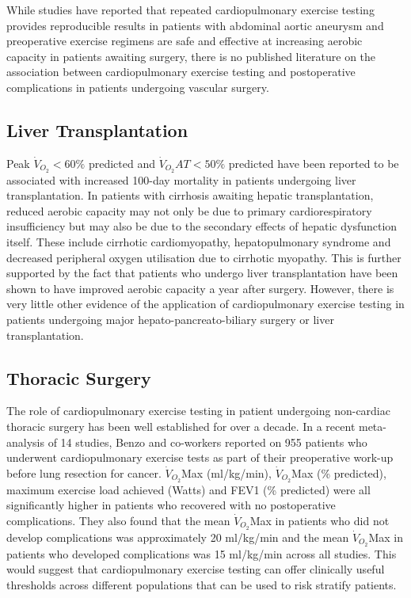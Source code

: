 While studies have reported that repeated cardiopulmonary exercise testing provides reproducible results in patients with abdominal aortic aneurysm and preoperative exercise regimens are safe and effective at increasing aerobic capacity in patients awaiting surgery, there is no published literature on the association between cardiopulmonary exercise testing and postoperative complications in patients undergoing vascular surgery. %

\subsection{Liver Transplantation}
Peak $\dot{V}_{O_2}<60\%$ predicted and $\dot{V}_{O_2}AT<50\%$ predicted have been reported to be associated with increased 100-day mortality in patients undergoing liver transplantation. In patients with cirrhosis awaiting hepatic transplantation, reduced aerobic capacity may not only be due to primary cardiorespiratory insufficiency but may also be due to the secondary effects of hepatic dysfunction itself. These include cirrhotic cardiomyopathy, hepatopulmonary syndrome and decreased peripheral oxygen utilisation due to cirrhotic myopathy.\parencite{epstein_aerobic_2004} This is further supported by the fact that patients who undergo liver transplantation have been shown to have improved aerobic capacity a year after surgery. \parencite{iscar_functional_2009} However, there is very little other evidence of the application of cardiopulmonary exercise testing in patients undergoing major hepato-pancreato-biliary surgery or liver transplantation.

\subsection{Thoracic Surgery}
The role of cardiopulmonary exercise testing in patient undergoing non-cardiac thoracic surgery has been well established for over a decade. In a recent meta-analysis of 14 studies, Benzo and co-workers reported on 955 patients who underwent cardiopulmonary exercise tests as part of their preoperative work-up before lung resection for cancer. $\dot{V}_{O_2}$Max (ml/kg/min), $\dot{V}_{O_2}$Max (\% predicted), maximum exercise load achieved (Watts) and FEV1 (\% predicted) were all significantly higher in patients who recovered with no postoperative complications. They also found that the mean $\dot{V}_{O_2}$Max in patients who did not develop complications was approximately 20 ml/kg/min and the mean $\dot{V}_{O_2}$Max in patients who developed complications was 15 ml/kg/min across all studies. This would suggest that cardiopulmonary exercise testing can offer clinically useful thresholds across different populations that can be used to risk stratify patients.\parencite{benzo_complications_2007}


